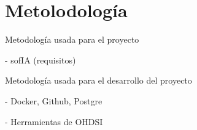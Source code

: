\chapter{Metolodología}\label{cap:04metodologia}

Metodología usada para el proyecto


- sofIA (requisitos)

Metodología usada para el desarrollo del proyecto

- Docker, Github, Postgre


- Herramientas de OHDSI

